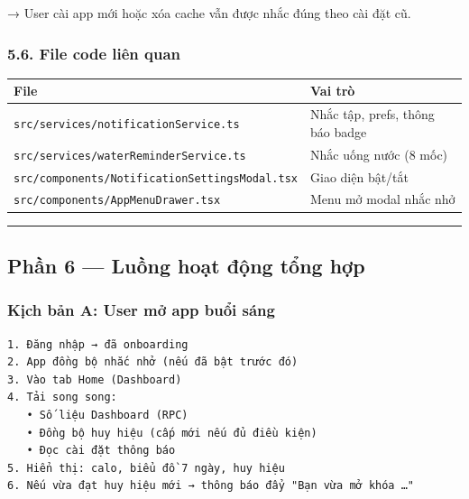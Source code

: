 \documentclass[12pt,a4paper]{article}
\newcounter{none}
\begin{document}
→ User cài app mới hoặc xóa cache vẫn được nhắc đúng theo cài đặt cũ.

\subsubsection{5.6. File code liên quan}\label{file-code-liuxean-quan-2}

{\def\LTcaptype{none} %
\begin{longtable}[]{@{}
  >{\raggedright\arraybackslash}p{}
  >{\raggedright\arraybackslash}p{}@{}}
\toprule\noalign{}
\begin{minipage}[b]{\linewidth}\raggedright
File
\end{minipage} & \begin{minipage}[b]{\linewidth}\raggedright
Vai trò
\end{minipage} \\
\midrule\noalign{}
\endhead
\bottomrule\noalign{}
\endlastfoot
\texttt{src/services/notificationService.ts} & Nhắc tập, prefs, thông
báo badge \\
\texttt{src/services/waterReminderService.ts} & Nhắc uống nước (8
mốc) \\
\texttt{src/components/NotificationSettingsModal.tsx} & Giao diện
bật/tắt \\
\texttt{src/components/AppMenuDrawer.tsx} & Menu mở modal nhắc nhở \\
\end{longtable}
}

\begin{center}\rule{0.5\linewidth}{0.5pt}\end{center}

\subsection{Phần 6 --- Luồng hoạt động tổng
hợp}\label{phux1ea7n-6-luux1ed3ng-houx1ea1t-ux111ux1ed9ng-tux1ed5ng-hux1ee3p}

\subsubsection{Kịch bản A: User mở app buổi
sáng}\label{kux1ecbch-bux1ea3n-a-user-mux1edf-app-buux1ed5i-suxe1ng}

\begin{verbatim}
1. Đăng nhập → đã onboarding
2. App đồng bộ nhắc nhở (nếu đã bật trước đó)
3. Vào tab Home (Dashboard)
4. Tải song song:
   • Số liệu Dashboard (RPC)
   • Đồng bộ huy hiệu (cấp mới nếu đủ điều kiện)
   • Đọc cài đặt thông báo
5. Hiển thị: calo, biểu đồ 7 ngày, huy hiệu
6. Nếu vừa đạt huy hiệu mới → thông báo đẩy "Bạn vừa mở khóa …"
\end{verbatim}
\end{document}
